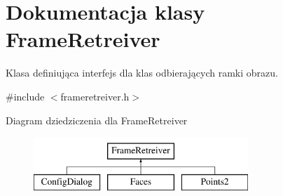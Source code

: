 \hypertarget{class_frame_retreiver}{
\section{Dokumentacja klasy FrameRetreiver}
\label{class_frame_retreiver}
}


Klasa definiująca interfejs dla klas odbierających ramki obrazu.  




{\ttfamily \#include $<$frameretreiver.h$>$}

Diagram dziedziczenia dla FrameRetreiver\begin{figure}[H]
\begin{center}
\leavevmode
\includegraphics[height=2cm]{class_frame_retreiver}
\end{center}
\end{figure}
